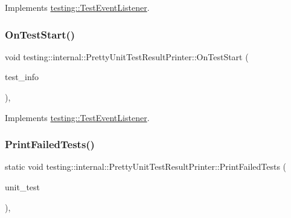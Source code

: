 Implements \mbox{\hyperlink{classtesting_1_1_test_event_listener_ab4f6a0ca16ae75daf385b3b5914e1048}{testing\+::\+Test\+Event\+Listener}}.

\mbox{\label{classtesting_1_1internal_1_1_pretty_unit_test_result_printer_a079ac0eb5f8cdd2511cfd33ef931338b}} 
\subsubsection{\texorpdfstring{OnTestStart()}{OnTestStart()}\hspace{0.1cm}{\footnotesize\ttfamily [3/3]}}
{\footnotesize\ttfamily void testing\+::internal\+::\+Pretty\+Unit\+Test\+Result\+Printer\+::\+On\+Test\+Start (\begin{DoxyParamCaption}\item[{const \mbox{\hyperlink{classtesting_1_1_test_info}{Test\+Info}} \&}]{test\+\_\+info }\end{DoxyParamCaption})\hspace{0.3cm}{\ttfamily [override]}, {\ttfamily [virtual]}}



Implements \mbox{\hyperlink{classtesting_1_1_test_event_listener_ab4f6a0ca16ae75daf385b3b5914e1048}{testing\+::\+Test\+Event\+Listener}}.

\mbox{\label{classtesting_1_1internal_1_1_pretty_unit_test_result_printer_aebb8c57362544a84166239fe0a6610bd}} 
\subsubsection{\texorpdfstring{PrintFailedTests()}{PrintFailedTests()}\hspace{0.1cm}{\footnotesize\ttfamily [1/3]}}
{\footnotesize\ttfamily static void testing\+::internal\+::\+Pretty\+Unit\+Test\+Result\+Printer\+::\+Print\+Failed\+Tests (\begin{DoxyParamCaption}\item[{const \mbox{\hyperlink{classtesting_1_1_unit_test}{Unit\+Test}} \&}]{unit\+\_\+test }\end{DoxyParamCaption})\hspace{0.3cm}{\ttfamily [static]}, {\ttfamily [private]}}

